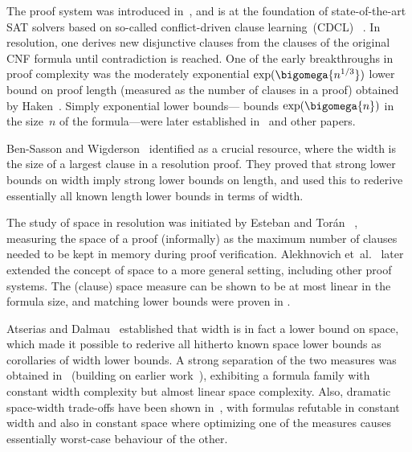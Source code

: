 \documentclass[11pt]{article}
\numberwithin{equation}{section}
\theoremstyle{definition}
\theoremstyle{plain}
\providecommand{\etal}{et~al.}
\begin{document}

The  proof system was introduced
in~\cite{Blake37Thesis}, and is at the foundation
of state-of-the-art SAT solvers based on so-called conflict-driven
clause learning~(CDCL)~%
\cite{BS97UsingCSP,MS99Grasp,MMZZM01Engineering}.
%
In resolution, one derives new disjunctive clauses 
from the clauses of the original CNF formula until 
contradiction is reached.
One of the early breakthroughs in proof complexity was the
%
%
%
moderately exponential %
%
%
%
%
%
%
$\exp(\bigomega{n^{1/3}})$   %
lower bound on proof length 
(measured as the number of clauses in a proof)
obtained by Haken~\cite{Haken85Intractability}.
%
Simply   %
exponential lower bounds---\ieComma
bounds $\exp(\bigomega{n})$
in the size~$n$ of the formula---were 
later  established in~%
\cite{CS88ManyHard,Urquhart87HardExamples}
and other papers.


Ben-Sasson and Wigderson~\cite{BW01ShortProofs}
identified 
as a crucial resource, where the width is the
size of a largest clause in a resolution proof.
They proved that strong lower bounds on width imply strong lower
bounds on length, and used this to rederive essentially all known
length lower bounds in terms of width.

The study of space in resolution was initiated by Esteban and Tor\'an~%
\cite{ET01SpaceBounds}, measuring the space of a proof (informally) as
the maximum number of clauses needed to be kept in memory during proof
verification. Alekhnovich \etal~\cite{ABRW02SpaceComplexity}
later extended the concept of space to a more general setting,
including other proof systems.
The (clause) space measure can be shown to be at most linear in the
formula size, and matching lower bounds were proven in
\cite{ABRW02SpaceComplexity,
  BG03SpaceComplexity,
  ET01SpaceBounds}.

Atserias and Dalmau~%
\cite{AD08CombinatoricalCharacterization}
established that %
width
is in fact
%
%
%
a lower bound on space, %
which made it possible
to rederive all hitherto known space lower bounds as corollaries of
width lower bounds.
%
A strong separation of the two measures
%
was obtained in~%
\cite{BN08ShortProofs}
(building on earlier 
work~\cite{Nordstrom09NarrowProofsSICOMP,NH13TowardsOptimalSeparation}),
exhibiting a formula family
with constant width complexity but almost
linear space complexity. 
%
Also, dramatic space-width trade-offs have been shown
in~\cite{Ben-Sasson09SizeSpaceTradeoffs}, 
with formulas refutable in constant width and
also in  %
constant space
%
where optimizing one of the
measures causes essentially worst-case behaviour of the 
other.
%
\end{document}
